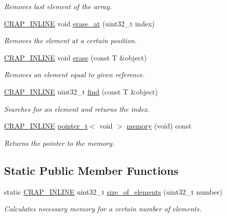 \begin{DoxyCompactItemize}
\begin{DoxyCompactList}\small\item\em Removes last element of the array. \end{DoxyCompactList}\item 
\hyperlink{config__x86_8h_a5a40526b8d842e7ff731509998bb0f1c}{C\+R\+A\+P\+\_\+\+I\+N\+L\+I\+N\+E} void \hyperlink{classcrap_1_1sorted__array_a5ad794c314b02288f6c4e727f6ed5dd6}{erase\+\_\+at} (uint32\+\_\+t index)
\begin{DoxyCompactList}\small\item\em Removes the element at a certain position. \end{DoxyCompactList}\item 
\hyperlink{config__x86_8h_a5a40526b8d842e7ff731509998bb0f1c}{C\+R\+A\+P\+\_\+\+I\+N\+L\+I\+N\+E} void \hyperlink{classcrap_1_1sorted__array_a515100392a0ff72425b6ff30d476df55}{erase} (const T \&object)
\begin{DoxyCompactList}\small\item\em Removes an element equal to given reference. \end{DoxyCompactList}\item 
\hyperlink{config__x86_8h_a5a40526b8d842e7ff731509998bb0f1c}{C\+R\+A\+P\+\_\+\+I\+N\+L\+I\+N\+E} uint32\+\_\+t \hyperlink{classcrap_1_1sorted__array_aca7ebbadcad54d26b850e6dffd8d5400}{find} (const T \&object)
\begin{DoxyCompactList}\small\item\em Searches for an element and returns the index. \end{DoxyCompactList}\item 
\hyperlink{config__x86_8h_a5a40526b8d842e7ff731509998bb0f1c}{C\+R\+A\+P\+\_\+\+I\+N\+L\+I\+N\+E} \hyperlink{structcrap_1_1pointer__t}{pointer\+\_\+t}$<$ void $>$ \hyperlink{classcrap_1_1sorted__array_a924b156d8b1da6c5a240d9a8ae78db4a}{memory} (void) const 
\begin{DoxyCompactList}\small\item\em Returns the pointer to the memory. \end{DoxyCompactList}\end{DoxyCompactItemize}
\subsection*{Static Public Member Functions}
\begin{DoxyCompactItemize}
\item 
static \hyperlink{config__x86_8h_a5a40526b8d842e7ff731509998bb0f1c}{C\+R\+A\+P\+\_\+\+I\+N\+L\+I\+N\+E} uint32\+\_\+t \hyperlink{classcrap_1_1sorted__array_a61c4294fb8cf1f0e0e9306f548988ac8}{size\+\_\+of\+\_\+elements} (uint32\+\_\+t number)
\begin{DoxyCompactList}\small\item\em Calculates necessary memory for a certain number of elements. \end{DoxyCompactList}\end{DoxyCompactItemize}
